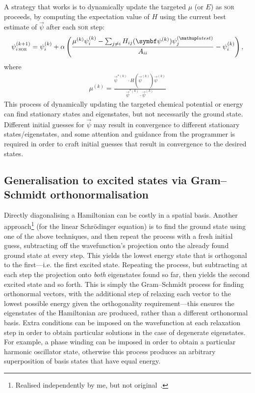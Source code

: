 A strategy that works is to dynamically update the targeted $\mu$ (or $E$) as \textsc{sor} proceeds, by computing the expectation value of $H$ using the current best estimate of $\vec\psi$ after each \textsc{sor} step:
\begin{align}
\psi^{(k+1)}_{i\,\textsc{sor}} = \psi^{(k)}_i + \alpha\left(\frac{\mu^{(k)}\psi^{(k)}_i - \sum_{j\neq i} H_{ij}(\vec\psi^{(k)})\psi^{(\up{latest})}_j}{A_{ii}} - \psi^{(k)}_i\right),
\end{align}
where
\begin{align}
\mu^{(k)} = \frac{\vec\psi^{*(k)}\cdot H(\vec\psi^{(k)})\vec\psi^{(k)}}
{\vec\psi^{*(k)}\cdot\vec\psi^{(k)}}
\end{align}
This process of dynamically updating the targeted chemical potential or energy can find stationary states and eigenstates, but not necessarily the ground state. Different initial guesses for $\vec\psi$ may result in convergence to different stationary states/eigenstates, and some attention and guidance from the programmer is required in order to craft initial guesses that result in convergence to the desired states.

\subsection{Generalisation to excited states via Gram–Schmidt orthonormalisation}\label{sec:excited_states_gram_schmidt}
Directly diagonalising a Hamiltonian can be costly in a spatial basis. Another approach\footnote{Realised independently by me, but not original~\cite{ahn_variational_1986}.} (for the linear Schr\"odinger equation) is to find the ground state using one of the above techniques, and then repeat the process with a fresh initial guess, subtracting off the wavefunction's projection onto the already found ground state at every step. This yields the lowest energy state that is orthogonal to the first---i.e. the first excited state. Repeating the process, but subtracting at each step the projection onto \emph{both} eigenstates found so far, then yields the second excited state and so forth. This is simply the Gram--Schmidt process for finding orthonormal vectors, with the additional step of relaxing each vector to the lowest possible energy given the orthogonality requirement---this ensures the eigenstates of the Hamiltonian are produced, rather than a different orthonormal basis. Extra conditions can be imposed on the wavefunction at each relaxation step in order to obtain particular solutions in the case of degenerate eigenstates. For example, a phase winding can be imposed in order to obtain a particular harmonic oscillator state, otherwise this process produces an arbitrary superposition of basis states that have equal energy.

